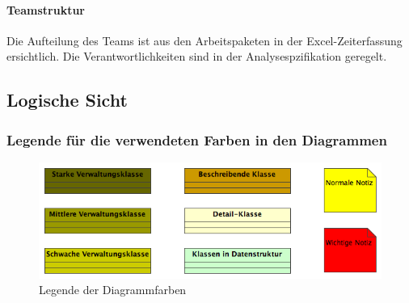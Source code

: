 \documentclass[a4paper,12pt,halfparskip,DIV14]{scrartcl}
\begin{document}
\paragraph{Teamstruktur}\label{ssub:teamstruktur} %
Die Aufteilung des Teams ist aus den Arbeitspaketen in der Excel-Zeiterfassung ersichtlich. Die Verantwortlichkeiten sind in der Analysespzifikation geregelt.

\newline
\subsection{Logische Sicht} %
\label{sub:logische_schicht}

\subsubsection{Legende für die verwendeten Farben in den Diagrammen} %
\label{ssub:legende_fuer_die_verwendeten_farben_in_den_diagrammen}
\begin{figure}
	[htp] \centering 
	\includegraphics[width=1\textwidth]{legende.png} \caption{Legende der Diagrammfarben}\label{fig:legende.png} 
\end{figure}
\end{document}
